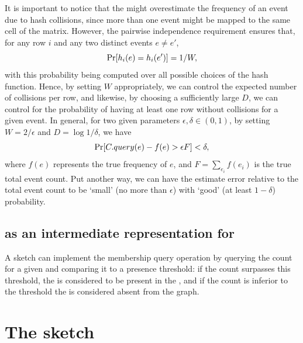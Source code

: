 It is important to notice that the \cm might overestimate the frequency of an event due to hash collisions, since more than one event might be mapped to the same cell of the matrix. However, the pairwise independence requirement ensures that, for any row $i$ and any two distinct events $e\neq e'$,
\begin{equation*}
\mathrm{Pr}[h_i(e)=h_i(e')] = 1/W,
\end{equation*}
with this probability being computed over all possible choices of the hash function.
Hence, by setting $W$ appropriately, we can control the expected number of collisions per row, and likewise, by choosing a sufficiently large $D$, we can control for the probability of having at least one row without collisions for a given event. In general, for two given parameters $\epsilon, \delta \in (0,1)$, by setting 
$W=2/\epsilon$ and $D=\log1/\delta$, we have
\begin{equation*}
\mathrm{Pr}[C.query(e) - f(e) > \epsilon F] < \delta,
\end{equation*}
where $f(e)$ represents the true frequency of $e$, and $F=\sum_{e_i}f(e_i)$ is the true total event count. Put another way, we can have the estimate error relative to the total event count to be `small' (no more than $\epsilon$) with `good' (at least $1-\delta$) probability.

\subsection{\cm as an intermediate representation for }

A \cm sketch can implement the membership query operation by querying the count for a given \kmer and comparing it to a presence threshold:
if the count surpasses this threshold, the \kmer is considered to be present in the \dBG, and if the count is inferior to the threshold the
\kmer is considered absent from the graph.

\section{The \dB\cm sketch}
\label{sec:debruijncountmin}



